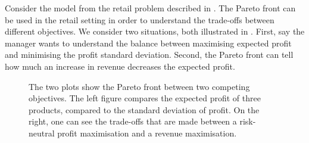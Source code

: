 \documentclass[main.tex]{subfiles}
\begin{document}
\begin{example}\label{ex:retail_pareto}
  Consider the model from the retail problem described in
  .
  The Pareto front can be used in the retail setting in order to understand the
  trade-offs between different objectives.
  We consider two situations, both illustrated in
  .
  First, say the manager wants to understand the balance between
  maximising expected profit and minimising the profit standard
  deviation.
  Second, the Pareto front can tell how much an increase in revenue
  decreases the expected profit.
  \begin{figure}[htbp]
    \centering
    \begin{subfigure}[h]{.5\textwidth}
    \end{subfigure}%
    \begin{subfigure}[h]{.5\textwidth}
    \end{subfigure}
    \caption[Two Pareto fronts of competing objects for a retail
    example]{The two plots show the Pareto front between two competing
      objectives. The left figure compares the expected profit of three
      products, compared to the standard deviation of profit.
      On the right, one can see the trade-offs that are made between
      a risk-neutral profit maximisation and a revenue maximisation.
}
\end{figure}
\end{example}
\end{document}
